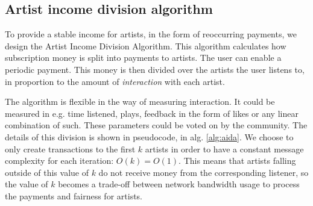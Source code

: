 \subsection{Artist income division algorithm}
\label{sec:aida-design}
To provide a stable income for artists, in the form of reoccurring payments, we design the Artist Income Division Algorithm. This algorithm calculates how subscription money is split into payments to artists. The user can enable a periodic payment. This money is then divided over the artists the user listens to, in proportion to the amount of \textit{interaction} with each artist. 

The algorithm is flexible in the way of measuring interaction. It could be measured in e.g. time listened, plays, feedback in the form of likes or any linear combination of such. These parameters could be voted on by the community. The details of this division is shown in pseudocode, in alg. \ref{alg:aida}. We choose to only create transactions to the first $k$ artists in order to have a constant message complexity for each iteration: $O(k) = O(1)$. This means that artists falling outside of this value of $k$ do not receive money from the corresponding listener, so the value of $k$ becomes a trade-off between network bandwidth usage to process the payments and fairness for artists.

